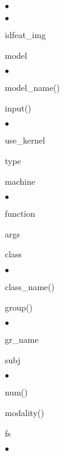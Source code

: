 \begin{list}{$\bullet$}
\begin{list}{$\bullet$}
    \item idfeat\_img
    \end{list}
\item model
    \begin{list}{$\bullet$}
        {\setlength{\labelsep}{.2cm}\setlength{\itemindent}{0cm}\setlength{\leftmargin}{0.7cm}}
    \item model\_name()
    \item input()
        \begin{list}{$\bullet$}
            {\setlength{\labelsep}{.2cm}\setlength{\itemindent}{0cm}\setlength{\leftmargin}{1.2cm}}
        \item use\_kernel
        \item type
        \item machine
            \begin{list}{$\bullet$}
                {\setlength{\labelsep}{.2cm}\setlength{\itemindent}{0cm}\setlength{\leftmargin}{1.7cm}}
            \item function
            \item args
            \end{list}
        \item class
            \begin{list}{$\bullet$}
                {\setlength{\labelsep}{.2cm}\setlength{\itemindent}{0cm}\setlength{\leftmargin}{1.7cm}}
            \item class\_name()
            \item group()
                \begin{list}{$\bullet$}
                    {\setlength{\labelsep}{.2cm}\setlength{\itemindent}{0cm}\setlength{\leftmargin}{2.2cm}}
                \item gr\_name
                \item subj
                    \begin{list}{$\bullet$}
                        {\setlength{\labelsep}{.2cm}\setlength{\itemindent}{0cm}\setlength{\leftmargin}{2.7cm}}
                    \item num()
                    \item modality()
                    \end{list}
                \end{list}
            \end{list}
        \item fs
            \begin{list}{$\bullet$}
                {\setlength{\labelsep}{.2cm}\setlength{\itemindent}{0cm}\setlength{\leftmargin}{1.7cm}}

\end{list}
\end{list}
\end{list}
\end{list}
